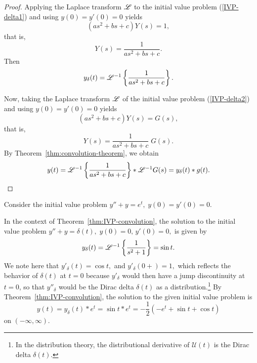 \begin{proof}
	Applying the Laplace transform $\mathscr{L}$ to the initial value problem (\ref{IVP-delta1}) and using $y(0)= y'(0)=0$  yields
	\[(as^2+bs +c)Y(s)= 1,\]that is,
	\[Y(s)= \frac{1}{as^2+bs +c}.\] Then 
	\[y_\delta(t) = \mathscr{L}^{-1}\left\{\frac{1}{as^2+bs +c}\right\}.\]
	
Now, taking the Laplace transform $\mathscr{L}$ of the initial value problem (\ref{IVP-delta2}) and using $y(0)= y'(0)=0$  yields
	\[(as^2+bs +c)Y(s)= G(s),\]that is,
	\[Y(s)= \frac{1}{as^2+bs +c}\; G(s).\] By Theorem~\ref{thm:convolution-theorem}, we obtain
	\[y(t) = \mathscr{L}^{-1}\left\{\frac{1}{as^2+bs +c}\right\}\ast \mathscr{L}^{-1}G(s) = y_\delta(t) \ast g(t).\qedhere\] 
\end{proof}
\begin{example}
	Consider the initial value problem $y''+ y= e^t,\; y(0) = y'(0)= 0.$
\end{example}
\begin{solution} In the context of Theorem~\ref{thm:IVP-convolution}, the solution to the initial value problem $y''+ y= \delta (t),\; y(0) = 0, \, y'(0)= 0,$ is given by 
	\[ y_\delta(t) = \mathscr{L}^{-1}\left\{\frac{1}{s^2+1}\right\} = \sin t.\]  We note here that $y'_\delta(t) =\cos t,$ and
	$y'_\delta (0+) = 1,$ which reflects  the behavior of $\delta(t)$ at $t = 0$ because  $y'_\delta $ would then have a jump discontinuity at $t = 0$, so that $y''_\delta $ would  be the Dirac delta $\delta(t)$ as a distribution.\footnote[1]{In the distribution theory, the distributional derivative of $\mathcal U(t)$ is the Dirac delta $\delta(t)$.} By Theorem~\ref{thm:IVP-convolution}, the solution to the given initial value problem is 
	\[ y(t) = y_\delta(t) \ast e^t = \sin t \ast e^t = -\frac{1}{2}\left(-e^t+\sin t+\cos t\right)\]
on $(-\infty, \infty).$
\end{solution}



